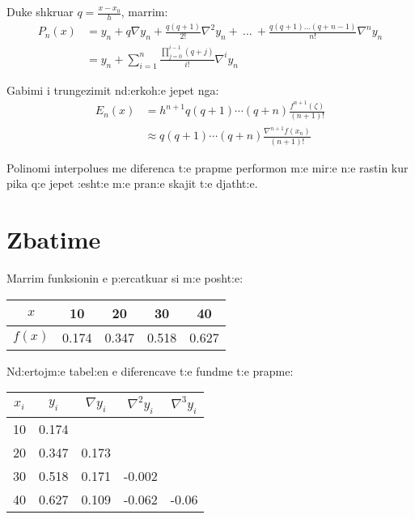 \documentclass[12pt, margin=1in, a4paper]{article}
\begin{document}
  Duke shkruar \(q = \frac{x - x_0}{h}\), marrim:
  \begin{equation}
  \begin{aligned}
    P_n(x) &= y_n + q\nabla y_n + \frac{q(q + 1)}{2!}\nabla^2y_n + \ \dots \ + \frac{q(q + 1)\dots(q + n - 1)}{n!}\nabla^n y_n \\
    &= y_n + \sum_{i = 1}^n{\frac{\prod_{j = 0}^{i - 1}{(q + j)}}{i!}\nabla^iy_n}
  \end{aligned}
  \end{equation}

  Gabimi i trungezimit nd:erkoh:e jepet nga:
  \begin{equation}
  \begin{aligned}
    E_n(x) &= h^{n + 1}q(q + 1) \cdots (q + n)\frac{f^{n + 1}(\zeta)}{(n + 1)!} \\
    &\approx q(q + 1) \cdots (q + n)\frac{\nabla^{n + 1}f(x_n)}{(n + 1)!}
  \end{aligned}
  \end{equation}

  Polinomi interpolues me diferenca t:e prapme performon m:e mir:e n:e rastin
  kur pika q:e jepet :esht:e m:e pran:e skajit t:e djatht:e.

  \newpage

\section{Zbatime}
  Marrim funksionin e p:ercatkuar si m:e posht:e:
  \begin{table*}[ht]
  \begin{tabular}{|c|c|c|c|c|}
    \hline
    \(x\) & 10 & 20 & 30 & 40 \\
    \hline
    \(f(x)\) & 0.174 & 0.347 & 0.518 & 0.627 \\
    \hline
  \end{tabular}
  \end{table*}

  Nd:ertojm:e tabel:en e diferencave t:e fundme t:e prapme:
  \begin{table*}[ht]
  \begin{tabular}{|c|c|c|c|c|}
    \hline
    \(x_i\) & \(y_i\) & \(\nabla y_i\) & \(\nabla^2y_i\) & \(\nabla^3y_i\) \\
    \hline
    10 & 0.174 & & & \\
    \hline
    20 & 0.347 & 0.173 & & \\
    \hline
    30 & 0.518 & 0.171 & -0.002 & \\
    \hline
    40 & 0.627 & 0.109 & -0.062 & -0.06 \\
    \hline
  \end{tabular}
  \end{table*}
\end{document}

